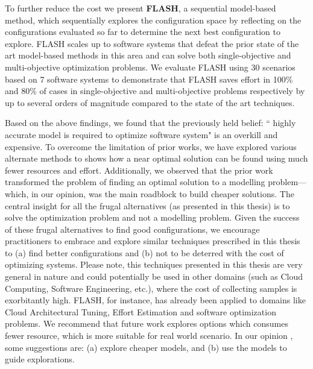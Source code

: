 To further reduce the cost we present \textbf{FLASH},  a sequential model-based method, which sequentially explores the configuration space by reflecting on the configurations evaluated so far to determine the next best configuration to explore. FLASH scales up to software systems that defeat the prior state of the art model-based methods in this area and can solve both single-objective and multi-objective optimization problems. We evaluate FLASH using 30 scenarios based on 7 software systems to demonstrate that FLASH saves effort in 100\% and 80\% of cases in single-objective and multi-objective problems respectively by up to several orders of magnitude compared to the state of the art techniques.

Based on the above findings, we found that the previously held belief: `` highly accurate model is required to optimize software system" is an overkill and expensive. To overcome the limitation of prior works, we have explored various alternate methods to shows how a near optimal solution can be found using much fewer resources and effort. Additionally, we observed that the prior work transformed the problem of finding an optimal solution to a modelling problem---which, in our opinion, was the main roadblock to build cheaper solutions. The central insight for all the frugal alternatives (as presented in this thesis) is to solve the optimization problem and not a modelling problem. Given the success of these frugal alternatives to find good configurations, we encourage practitioners to embrace and explore similar techniques prescribed in this thesis to (a) find better configurations and (b) not to be deterred with the cost of optimizing systems. Please note, this techniques presented in this thesis are very general in nature and could potentially be used in other domains (such as Cloud Computing, Software Engineering, etc.), where the cost of collecting samples is exorbitantly high. FLASH, for instance, has already been applied to domains like Cloud Architectural Tuning, Effort Estimation and software optimization problems. We recommend that future work explores options which consumes fewer resource, which is more suitable for real world scenario. In our opinion , some suggestions are: (a) explore cheaper models, and (b) use the models to guide explorations.